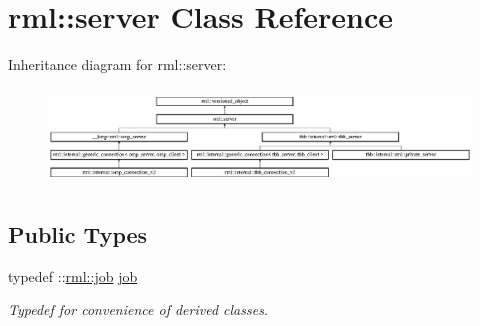 \hypertarget{classrml_1_1server}{}\section{rml\+:\+:server Class Reference}
\label{classrml_1_1server}
Inheritance diagram for rml\+:\+:server\+:\begin{figure}[H]
\begin{center}
\leavevmode
\includegraphics[height=2.571166cm]{classrml_1_1server}
\end{center}
\end{figure}
\subsection*{Public Types}
\begin{DoxyCompactItemize}
\item 
\hypertarget{classrml_1_1server_ac812e52a5bb3de275e624c36997eac0e}{}typedef \+::\hyperlink{classrml_1_1job}{rml\+::job} \hyperlink{classrml_1_1server_ac812e52a5bb3de275e624c36997eac0e}{job}\label{classrml_1_1server_ac812e52a5bb3de275e624c36997eac0e}

\begin{DoxyCompactList}\small\item\em Typedef for convenience of derived classes. \end{DoxyCompactList}\end{DoxyCompactItemize}
